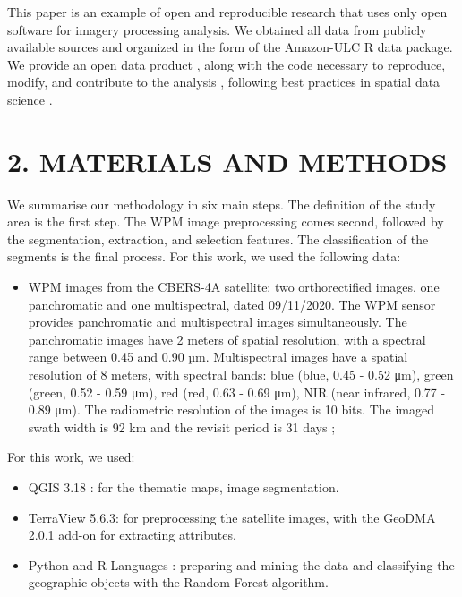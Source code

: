 \documentclass[preprint, 3p,
authoryear]{elsarticle} %
\providecommand{\tightlist}{%
  \setlength{\itemsep}{0pt}\setlength{\parskip}{0pt}}
\begin{document}
This paper is an example of open and reproducible research that uses
only open software for imagery processing analysis. We obtained all data
from publicly available sources and organized in the form of the
Amazon-ULC R data package. We provide an open data product
\citep{arribas2021open}, along with the code necessary to reproduce,
modify, and contribute to the analysis , following best practices in
spatial data science \citep{brunsdon2021opening, DESJARDINS2022103091}.

\hypertarget{materials-and-methods}{%
\section{2. MATERIALS AND METHODS}\label{materials-and-methods}}

We summarise our methodology in six main steps. The definition of the
study area is the first step. The WPM image preprocessing comes second,
followed by the segmentation, extraction, and selection features. The
classification of the segments is the final process. For this work, we
used the following data:

\begin{itemize}
\tightlist
\item
  WPM images from the CBERS-4A satellite: two orthorectified images, one
  panchromatic and one multispectral, dated 09/11/2020. The WPM sensor
  provides panchromatic and multispectral images simultaneously. The
  panchromatic images have 2 meters of spatial resolution, with a
  spectral range between 0.45 and 0.90 µm. Multispectral images have a
  spatial resolution of 8 meters, with spectral bands: blue (blue, 0.45
  - 0.52 μm), green (green, 0.52 - 0.59 μm), red (red, 0.63 - 0.69 μm),
  NIR (near infrared, 0.77 - 0.89 μm). The radiometric resolution of the
  images is 10 bits. The imaged swath width is 92 km and the revisit
  period is 31 days \citep{INPE2019};
\end{itemize}

For this work, we used:

\begin{itemize}
\item
  QGIS 3.18 \citep{QGISTeam2021}: for the thematic maps, image
  segmentation.
\item
  TerraView 5.6.3: for preprocessing the satellite images, with the
  GeoDMA 2.0.1 add-on \citep{Körting2013} for extracting attributes.
\item
  Python \citep{vanRossum1995} and R Languages \citep{R2022} : preparing
  and mining the data and classifying the geographic objects with the
  Random Forest algorithm.
\end{itemize}
\end{document}
